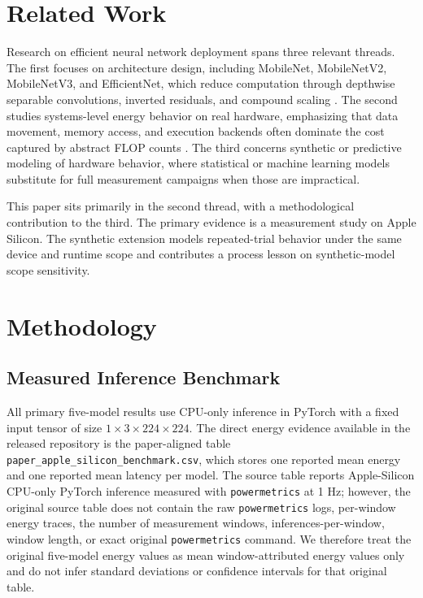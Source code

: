 \documentclass[conference]{IEEEtran}
\begin{document}
\section{Related Work}
Research on efficient neural network deployment spans three relevant threads.
The first focuses on architecture design, including MobileNet, MobileNetV2,
MobileNetV3, and EfficientNet, which reduce computation through depthwise
separable convolutions, inverted residuals, and compound scaling
\cite{mobilenet2017,mobilenetv22018,mobilenetv32019,efficientnet2019}. The
second studies systems-level energy behavior on real hardware, emphasizing
that data movement, memory access, and execution backends often dominate the
cost captured by abstract FLOP counts
\cite{horowitz2014,mittal2019,eyeriss2017,hardwareaware2019}. The third
concerns synthetic or predictive modeling of hardware behavior, where
statistical or machine learning models substitute for full measurement
campaigns when those are impractical.

This paper sits primarily in the second thread, with a methodological
contribution to the third. The primary evidence is a measurement study on
Apple Silicon. The synthetic extension models repeated-trial behavior under
the same device and runtime scope and contributes a process lesson on
synthetic-model scope sensitivity.

\section{Methodology}

\subsection{Measured Inference Benchmark}
All primary five-model results use CPU-only inference in PyTorch with a fixed
input tensor of size $1 \times 3 \times 224 \times 224$. The direct energy
evidence available in the released repository is the paper-aligned table
\texttt{paper\_apple\_silicon\_benchmark.csv}, which stores one reported mean
energy and one reported mean latency per model. The source table reports
Apple-Silicon CPU-only PyTorch inference measured with \texttt{powermetrics} at
1 Hz; however, the original source table does not contain the raw
\texttt{powermetrics} logs, per-window energy traces, the number of
measurement windows, inferences-per-window, window length, or exact original
\texttt{powermetrics} command. We therefore treat the original five-model
energy values as mean window-attributed energy values only and do not infer
standard deviations or confidence intervals for that original table.
\end{document}

